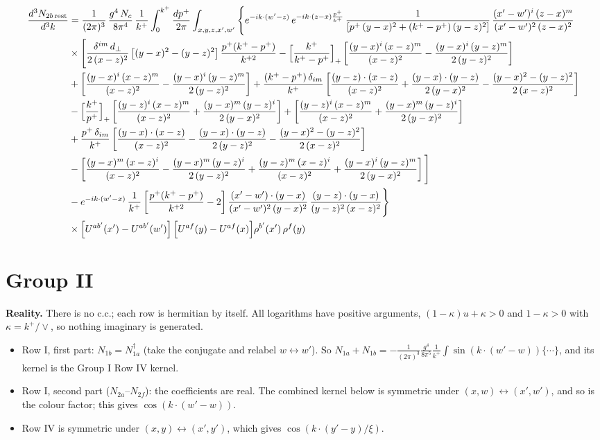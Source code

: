 \documentclass[9pt]{article}
\numberwithin{equation}{section}
\begin{document}
\begin{align}
\frac{d^{3}N_{2b\,\rm rest}}{d^{3}k} & =\frac{1}{(2\pi)^{3}}\,\frac{g^{4}\,N_{c}}{8\pi^{4}}\,\frac{1}{k^{+}}\int_{0}^{k^{+}}\frac{dp^{+}}{2\pi}\int_{x,y,z,x',w'}\Bigg\{e^{-ik\cdot(w'-z)}\,e^{-ik\cdot(z-x)\frac{p^{+}}{k^{+}}}\,\frac{1}{\left[p^{+}\,(y-x)^{2}+(k^{+}-p^{+})\,(y-z)^{2}\right]}\,\frac{(x'-w')^{i}\,(z-x)^{m}}{(x'-w')^{2}\,(z-x)^{2}}\notag\\
&\times\Bigg[\frac{\delta^{im}\,d_{\perp}}{2\,(x-z)^{2}}\left[(y-x)^{2}-(y-z)^{2}\right]\frac{p^{+}(k^{+}-p^{+})}{k^{+2}}
-\Big[\frac{k^{+}}{k^{+}-p^{+}}\Big]_{+}\left[\frac{(y-x)^{i}\,(x-z)^{m}}{(x-z)^{2}}-\frac{(y-x)^{i}\,(y-z)^{m}}{2\,(y-z)^{2}}\right]\notag\\
&+\left[\frac{(y-x)^{i}\,(x-z)^{m}}{(x-z)^{2}}-\frac{(y-x)^{i}\,(y-z)^{m}}{2\,(y-z)^{2}}\right]
+\frac{(k^{+}-p^{+})\,\delta_{im}}{k^{+}}\left[\frac{(y-z)\cdot(x-z)}{(x-z)^{2}}+\frac{(y-x)\cdot(y-z)}{2\,(y-x)^{2}}-\frac{(y-x)^{2}-(y-z)^{2}}{2\,(x-z)^{2}}\right]\notag\\
&-\Big[\frac{k^{+}}{p^{+}}\Big]_{+}\left[\frac{(y-z)^{i}\,(x-z)^{m}}{(x-z)^{2}}+\frac{(y-x)^{m}\,(y-z)^{i}}{2\,(y-x)^{2}}\right]+\left[\frac{(y-z)^{i}\,(x-z)^{m}}{(x-z)^{2}}+\frac{(y-x)^{m}\,(y-z)^{i}}{2\,(y-x)^{2}}\right]\notag\\
&+\frac{p^{+}\,\delta_{im}}{k^{+}}\left[\frac{(y-x)\cdot(x-z)}{(x-z)^{2}}-\frac{(y-x)\cdot(y-z)}{2\,(y-z)^{2}}-\frac{(y-x)^{2}-(y-z)^{2}}{2\,(x-z)^{2}}\right]\notag\\
&-\left[\frac{(y-x)^{m}\,(x-z)^{i}}{(x-z)^{2}}-\frac{(y-x)^{m}\,(y-z)^{i}}{2\,(y-z)^{2}}+\frac{(y-z)^{m}\,(x-z)^{i}}{(x-z)^{2}}+\frac{(y-x)^{i}\,(y-z)^{m}}{2\,(y-x)^{2}}\right]\Bigg]\notag\\
&-e^{-ik\cdot(w'-x)}\,\frac{1}{k^{+}}\left[\frac{p^{+}(k^{+}-p^{+})}{k^{+2}}-2\right]\frac{(x'-w')\cdot(y-x)}{(x'-w')^{2}\,(y-x)^{2}}\,\frac{(y-z)\cdot(y-x)}{(y-z)^{2}\,(x-z)^{2}}\Bigg\}\notag\\
&\times\Big[U^{ab'}(x')-U^{ab'}(w')\Big]\,\Big[U^{af}(y)-U^{af}(x)\Big]\rho^{b'}(x')\,\rho^{f}(y)
\end{align}
\section{Group II}
{\color{red}\textbf{Reality.} There is no c.c.; each row is hermitian by itself. All logarithms have positive arguments, $(1-\kappa)u+\kappa>0$ and $1-\kappa>0$ with $\kappa=k^{+}/\vee$, so nothing imaginary is generated.
\begin{itemize}
\item Row I, first part: $N_{1b}=N_{1a}^{\dagger}$ (take the conjugate and relabel $w\leftrightarrow w'$). So $N_{1a}+N_{1b}=-\frac{1}{(2\pi)^{3}}\frac{g^{4}}{8\pi^{5}}\frac{1}{k^{+}}\int\sin(k\cdot(w'-w))\{\cdots\}$, and its kernel is the Group I Row IV kernel.
\item Row I, second part ($N_{2a}$--$N_{2f}$): the coefficients are real. The combined kernel below is symmetric under $(x,w)\leftrightarrow(x',w')$, and so is the colour factor; this gives $\cos(k\cdot(w'-w))$.
\item Row IV is symmetric under $(x,y)\leftrightarrow(x',y')$, which gives $\cos(k\cdot(y'-y)/\xi)$.
\end{itemize}}
\end{document}
